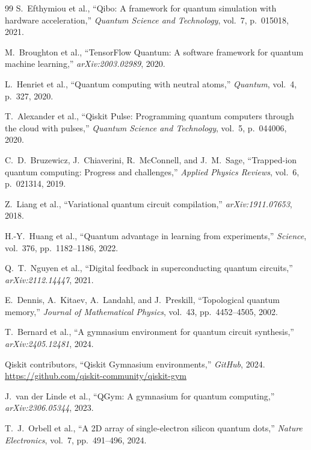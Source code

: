 \documentclass[journal]{IEEEtran}
\begin{document}
\begin{thebibliography}{99}
S.~Efthymiou et al.,
``Qibo: A framework for quantum simulation with hardware acceleration,''
\textit{Quantum Science and Technology}, vol.~7, p.~015018, 2021.

M.~Broughton et al.,
``TensorFlow Quantum: A software framework for quantum machine learning,''
\textit{arXiv:2003.02989}, 2020.

L.~Henriet et al.,
``Quantum computing with neutral atoms,''
\textit{Quantum}, vol.~4, p.~327, 2020.

T.~Alexander et al.,
``Qiskit Pulse: Programming quantum computers through the cloud with pulses,''
\textit{Quantum Science and Technology}, vol.~5, p.~044006, 2020.

C.~D.~Bruzewicz, J.~Chiaverini, R.~McConnell, and J.~M.~Sage,
``Trapped-ion quantum computing: Progress and challenges,''
\textit{Applied Physics Reviews}, vol.~6, p.~021314, 2019.

Z.~Liang et al.,
``Variational quantum circuit compilation,''
\textit{arXiv:1911.07653}, 2018.

H.-Y.~Huang et al.,
``Quantum advantage in learning from experiments,''
\textit{Science}, vol.~376, pp.~1182--1186, 2022.

Q.~T.~Nguyen et al.,
``Digital feedback in superconducting quantum circuits,''
\textit{arXiv:2112.14447}, 2021.

E.~Dennis, A.~Kitaev, A.~Landahl, and J.~Preskill,
``Topological quantum memory,''
\textit{Journal of Mathematical Physics}, vol.~43, pp.~4452--4505, 2002.

T.~Bernard et al.,
``A gymnasium environment for quantum circuit synthesis,''
\textit{arXiv:2405.12481}, 2024.

{Qiskit contributors},
``Qiskit Gymnasium environments,''
\textit{GitHub}, 2024. \url{https://github.com/qiskit-community/qiskit-gym}

J.~van der Linde et al.,
``QGym: A gymnasium for quantum computing,''
\textit{arXiv:2306.05344}, 2023.

T.~J.~Orbell et al.,
``A 2D array of single-electron silicon quantum dots,''
\textit{Nature Electronics}, vol.~7, pp.~491--496, 2024.


\end{thebibliography}
\end{document}
